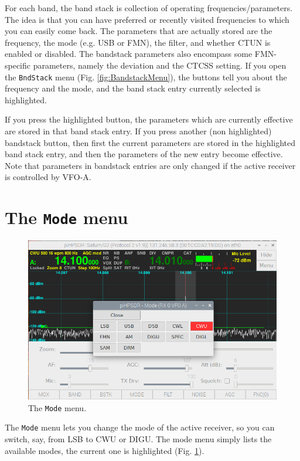 \documentclass[12pt]{book}
\def\bltt#1{\texttt{\color{blue}#1}}
\begin{document}
For each band, the band stack is collection of operating frequencies/parameters. The idea is that
you can have preferred or recently visited frequencies to which you can easily come back.
The parameters that are actually stored are the frequency, the mode (e.g. USB or FMN),
the filter, and whether CTUN is enabled or disabled. The bandstack parameters
also encompass some FMN-specific parameters,  namely the deviation and
the  CTCSS setting.
If you open the \bltt{BndStack} menu (Fig. \ref{fig:BandstackMenu}), the buttons
tell you about the frequency and the mode, and the band stack entry currently selected is highlighted.

If you press the highlighted button, the parameters which are currently effective are stored in that band stack
entry. If you press another (non highlighted) bandstack button, then first the current 
parameters are stored in the highlighted band stack entry, and then the parameters of the
new entry become effective. Note that parameters in bandstack entries are only changed if the active
receiver is controlled by VFO-A. 

\section{The \texttt{Mode} menu}
\begin{figure}[ht]
\center
\includegraphics[width=12cm]{ModeMenu.png}
\caption{The \bltt{Mode} menu.}
\label{fig:ModeMenu}
\end{figure}

The \bltt{Mode} menu lets you change the mode of the active receiver, so you can switch,
say, from LSB to CWU or DIGU. The mode menu simply lists the available modes, the current
one is highlighted (Fig. \ref{fig:ModeMenu}).
\end{document}
